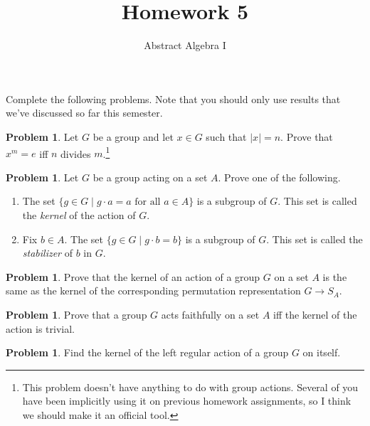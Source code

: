 \documentclass[11pt]{scrartcl}
\theoremstyle{definition}
\newtheorem{problem}[theorem]{Problem}
\begin{document}
\title{Homework 5}
\subtitle{Abstract Algebra I}
\date{}

\maketitle
\thispagestyle{fancy}

Complete the following problems. Note that you should only use results that we've discussed so far this semester. 

\begin{problem}
Let $G$ be a group and let $x\in G$ such that $|x|=n$.  Prove that $x^m=e$ iff $n$ divides $m$.\footnote{This problem doesn't have anything to do with group actions. Several of you have been implicitly using it on previous homework assignments, so I think we should make it an official tool.}
\end{problem}

\begin{problem}
Let $G$ be a group acting on a set $A$. Prove one of the following.
\begin{enumerate}[label=\rm{(\alph*)}]
\item The set $\{g\in G\mid g\cdot a = a\text{ for all }a\in A\}$ is a subgroup of $G$.  This set is called the \emph{kernel} of the action of $G$.
\item  Fix $b\in A$. The set $\{g\in G\mid g\cdot b =b\}$ is a subgroup of $G$. This set is called the \emph{stabilizer} of $b$ in $G$.
\end{enumerate}
\end{problem}

\begin{problem}
Prove that the kernel of an action of a group $G$ on a set $A$ is the same as the kernel of the corresponding permutation representation $G\to S_A$.
\end{problem}

\begin{problem}
Prove that a group $G$ acts faithfully on a set $A$ iff the kernel of the action is trivial.
\end{problem}


\begin{problem}
Find the kernel of the left regular action of a group $G$ on itself.
\end{problem}
\end{document}
